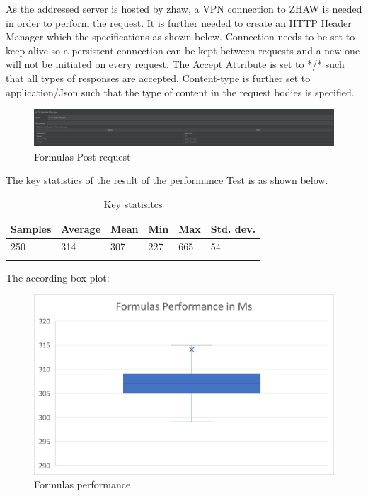  As the addressed server is hosted by zhaw, a VPN connection to ZHAW is needed in order to perform the request. It is further needed to create an HTTP Header Manager which the specifications as shown below. Connection needs to be set to keep-alive so a persistent connection can be kept between requests and a new one will not be initiated on every request. The Accept Attribute is set to */* such that all types of responses are accepted. Content-type is further set to application/Json such that the type of content in the request bodies is specified. \\[0.5cm]

\begin{figure}[h!]
  \includegraphics[scale=0.5]{Report/Figures/Http Header Manager.png}
  \caption{Formulas Post request}
  \label{fig: Http Header Manager}
\end{figure}

The key statistics of the result of the performance Test is as shown below. 

\begin{longtable}[]{@{}llllll@{}}
\toprule
Samples & Average & Mean & Min & Max & Std. dev.\tabularnewline
\midrule
\endhead
250 & 314 & 307 & 227 & 665 & 54\tabularnewline
\bottomrule
\caption{Key statisitcs}
\label{Required API permissions}
\end{longtable}

The according box plot:

\begin{figure}[h!]
  \includegraphics[scale=1]{Report/Figures/Formulas performance.jpg}
  \caption{Formulas performance}
  \label{fig: Formulas performance}
\end{figure}

